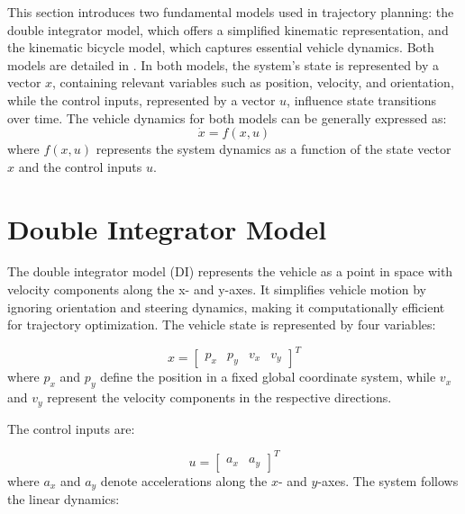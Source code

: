 
This section introduces two fundamental models used in trajectory planning: the double integrator model, which offers a simplified kinematic
representation, and the kinematic bicycle model, which captures essential vehicle dynamics.
Both models are detailed in \cite{noauthor_dateien_2021}.
In both models, the system's state is represented by a vector $x$, containing relevant variables such as position, velocity, and orientation, while
the control inputs, represented by a vector $u$, influence state transitions over time.
The vehicle dynamics for both models can be generally expressed as:
\begin{equation}
	\dot{x} = f(x, u)
\end{equation}
where $f(x, u)$ represents the system dynamics as a function of the state vector $x$ and the
control inputs $u$.

\section{Double Integrator Model} \label{subsec:point_mass_model}

The double integrator model (DI) represents the vehicle as a point in space with velocity components along the x- and y-axes.
It simplifies vehicle motion by ignoring orientation and steering dynamics, making it computationally efficient for trajectory optimization.
The vehicle state is represented by four variables:

\begin{equation}
	x = \begin{bmatrix} p_x & p_y & v_x & v_y \end{bmatrix}^T
	\label{eq:states_pm}
\end{equation}
where $p_x$ and $p_y$ define the position in a fixed global coordinate system, while $v_x$ and $v_y$
represent the velocity components in the respective directions.

The control inputs are:

\begin{equation}
	u = \begin{bmatrix} a_x & a_y \end{bmatrix}^T
	\label{eq:controls_pm}
\end{equation}
where $a_x$ and $a_y$ denote accelerations along the $x$- and $y$-axes.
The system follows the linear dynamics:

